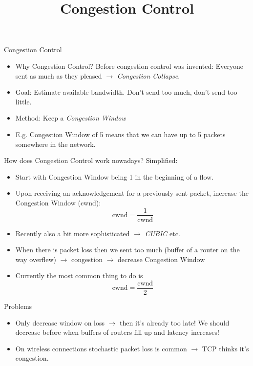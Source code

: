 \documentclass[11pt]{beamer}
\title{Congestion Control}
\begin{document}
\begin{frame}
\titlepage
\end{frame}


\begin{frame}{Congestion Control}
\begin{itemize}
\item Why Congestion Control? Before congestion control was invented: Everyone sent as much as they pleased $\rightarrow$ \textit{Congestion Collapse}.
\item Goal: Estimate available bandwidth. Don't send too much, don't send too little.
\item Method: Keep a \textit{Congestion Window}
\item E.g. Congestion Window of 5 means that we can have up to 5 packets somewhere in the network.
\end{itemize}
\end{frame}

\begin{frame}{How does Congestion Control work nowadays?}
Simplified:
\begin{itemize}
\item Start with Congestion Window being 1 in the beginning of a flow.
\item Upon receiving an acknowledgement for a previously sent packet, increase the Congestion Window (cwnd): $$\text{cwnd} = \frac{1}{\text{cwnd}}$$
\item Recently also a bit more sophisticated $\rightarrow$ \textit{CUBIC} etc. 
\item When there is packet loss then we sent too much (buffer of a router on the way overflew) $\rightarrow$ congestion $\rightarrow$ decrease Congestion Window
\item Currently the most common thing to do is $$\text{cwnd} = \frac{\text{cwnd}}{2}$$
\end{itemize}
\end{frame}

\begin{frame}{Problems}
\begin{itemize}
\item Only decrease window on loss $\rightarrow$ then it's already too late! We should decrease before when buffers of routers fill up and latency increases!
\item On wireless connections stochastic packet loss is common $\rightarrow$ TCP thinks it's congestion.
\end{itemize}
\end{frame}
\end{document}
